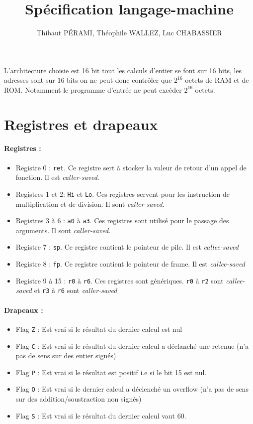 \documentclass[12pt]{article}
\title{Spécification langage-machine}
\author{Thibaut PÉRAMI, Théophile WALLEZ, Luc CHABASSIER}
\begin{document}
\maketitle

L'architecture choisie est 16 bit tout les calculs d'entier se font sur 16 bits,
les adresses sont sur 16 bits on ne peut donc contrôler que $2^{16}$ octets de
RAM et de ROM. Notamment le programme d'entrée ne peut excéder $2^{16}$ octets.

\section{Registres et drapeaux}

\paragraph{Registres :}
\begin{itemize}
\item Registre 0 : \verb!ret!. Ce registre sert à stocker la valeur de retour
  d'un appel de fonction. Il est \textit{caller-saved}.
\item Registres 1 et 2: \verb!Hi! et \verb!Lo!. Ces registres servent pour les
  instruction de multiplication et de division. Il sont \textit{caller-saved}.
\item Registres 3 à 6 : \verb!a0! à \verb!a3!. Ces registres sont utilisé pour
  le passage des arguments. Il sont \textit{caller-saved}.
\item Registre 7 : \verb!sp!. Ce registre contient le pointeur de pile. Il est
  \textit{callee-saved}
\item Registre 8 : \verb!fp!. Ce registre contient le pointeur de frame. Il est
  \textit{callee-saved}
  \item Registre 9 à 15 : \verb!r0! à \verb!r6!. Ces registres sont génériques.
    \verb!r0! à \verb!r2! sont \textit{callee-saved} et \verb!r3! à \verb!r6! sont \textit{caller-saved}
\end{itemize}

\paragraph{Drapeaux :}
\begin{itemize}
\item Flag \verb!Z! : Est vrai si le résultat du dernier calcul est nul
\item Flag \verb!C! : Est vrai si le résultat du dernier calcul a déclanché une
  retenue (n'a pas de sens sur des entier signés)
\item Flag \verb!P! : Est vrai si le résultat est positif i.e si le bit 15
  est nul.
\item Flag \verb!O! : Est vrai si le dernier calcul a déclenché un overflow (n'a
  pas de sens sur des addition/soustraction non signés)
\item Flag \verb!S! : Est vrai si le résultat du dernier calcul vaut 60.
\end{itemize}
\end{document}
